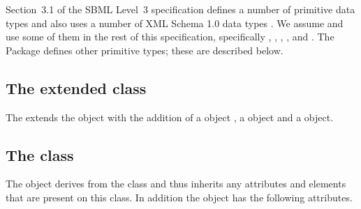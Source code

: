 Section~3.1 of the SBML Level~3 specification defines a number of
primitive data types and also uses a number of XML Schema 1.0 data types
\citep{biron:2000}. We assume and use some of them in the rest of this
specification, specifically , ,
, , and . The
\SIDReferences Package defines other primitive types; these are
described below.


\subsection{The extended  class}
\label{model-class}




The \SIDReferencesPackage extends the  object with the
addition of
a \ThingA object
, a \ThingB object
and a \ListOfThingCs object.

\subsection{The  class}
\label{thinga-class}




The \ThingA object derives from the \SBase class and thus inherits any
attributes and elements that are present on this class.
In addition the \ThingA object has the following attributes.

